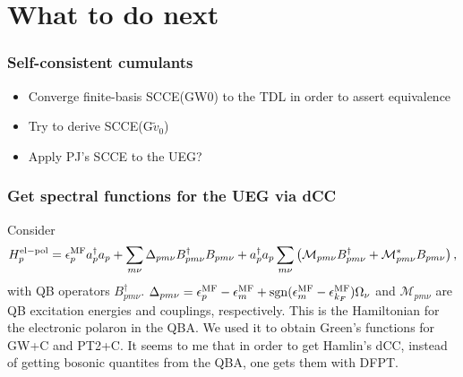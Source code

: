 \section{What to do next}
\begin{frame}
    \frametitle{Self-consistent cumulants}
\begin{itemize}
    \item Converge finite-basis SCCE(GW0) to the TDL in order to assert equivalence\pause
    \item Try to derive SCCE(G$\tilde{v}_0$) \pause
    \item Apply PJ's SCCE to the UEG?
\end{itemize}
\end{frame}

\begin{frame}
    \frametitle{Get spectral functions for the UEG via dCC}
Consider
\begin{equation}
H_p^{\rm el-pol}
=
\epsilon_p^{\rm MF} a_p^{\dagger} a_p
+
\sum_{m\nu}
\Delta_{pm\nu}
B_{pm\nu}^{\dagger}
B_{pm\nu}
+ a_p^{\dagger} a_p
\sum_{m\nu}
\left(
\mathcal{M}_{pm\nu}
B_{pm\nu}^{\dagger}
+
\mathcal{M}_{pm\nu}^{*}
B_{pm\nu}
\right),
\end{equation}
with QB operators $B_{pm\nu}^{\dagger}$. \pause
$\Delta_{pm\nu} = \epsilon_p^{\rm MF} - \epsilon_m^{\rm MF} + \operatorname{sgn}(\epsilon_m^{\rm MF} - \epsilon^{\rm MF}_{k_F})\Omega_\nu$ and $\mathcal{M}_{pm\nu}$ are QB excitation energies and couplings, respectively. \pause
This is the Hamiltonian for the electronic polaron in the QBA. \pause We used it to obtain Green's functions for GW+C and PT2+C. \pause It seems to me that in order to get Hamlin's dCC, instead of getting bosonic quantites from the QBA, one gets them with DFPT.
\end{frame}
